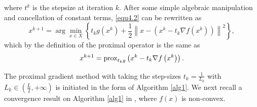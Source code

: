 \documentclass[a4paper,12pt]{article}
\numberwithin{equation}{section}
\begin{document}
where $t^{k}$ is the stepsize at iteration $k$. After some simple algebraic manipulation and cancellation of constant terms, \eqref{equ4.2} can be rewritten as
\begin{equation*}
    x^{k+1}=\arg\min_{x\in X}\left\{t_{k}g\left(x^{k}\right)+ \frac{1}{2}\left\|x-\left(x^{k}-t_{k}\nabla f\left(x^{k}\right)\right)\right\|^{2}\right\},
\end{equation*}
which by the definition of the proximal operator is the same as
\begin{equation}\label{equ4.3}
    x^{k+1}={\rm prox}_{t_{k}g}\left(x^{k}-t_{k}\nabla f\left(x^{k}\right)\right).
\end{equation}

\par The proximal gradient method with taking the step-sizes $t_{k}=\frac{1}{L_{k}}$ with $L_{k}\in\left(\frac{L}{2}, +\infty\right)$ is initiated in the form of Algorithm \ref{alg1}.  We next recall a convergence result on Algorithm \ref{alg1} in \cite[Theorem 10.15]{BA17}, where $f\left(x\right)$ is non-convex.

\begin{algorithm}
\caption{Proximal gradient method}
\begin{algorithmic}\label{alg1}
\end{algorithmic}
\end{algorithm}
\end{document}
